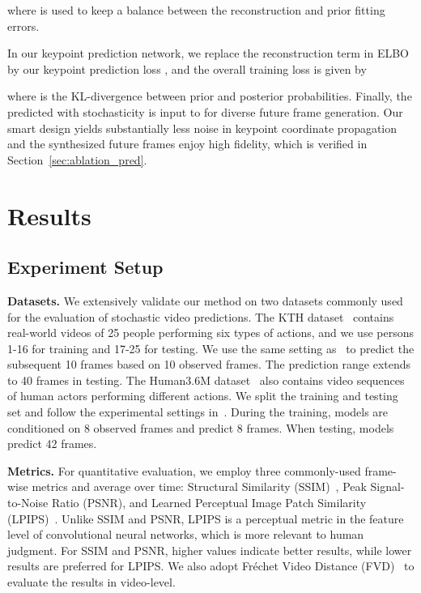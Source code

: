 \documentclass[letterpaper, 10 pt, conference]{ieeeconf}
\begin{document}
where  is used to keep a balance between the reconstruction and prior fitting errors. 

In our keypoint prediction network, we replace the reconstruction term in ELBO by our keypoint prediction loss , and the overall training loss is given by

where  is the KL-divergence between prior and posterior probabilities. 
Finally, the predicted  with stochasticity is input to  for diverse future frame generation.
Our smart design yields substantially less noise in keypoint coordinate propagation and the synthesized future frames enjoy high fidelity, which is verified in Section~\ref{sec:ablation_pred}.







\section{Results}

\subsection{Experiment Setup}
\noindent\textbf{Datasets.}
We extensively validate our method on two datasets commonly used for the evaluation of stochastic video predictions. 
The KTH dataset~\cite{schuldt2004recognizing} contains real-world videos of 25 people performing six types of actions, and we use persons 1-16 for training and 17-25 for testing.
We use the same setting as~\cite{denton2018stochastic} to predict the subsequent 10 frames based on 10 observed frames. 
The prediction range extends to 40 frames in testing. 
The Human3.6M dataset~\cite{ionescu2013human3} also contains video sequences of human actors performing different actions.
We split the training and testing set and follow the experimental settings in~\cite{minderer2019unsupervised}.
During the training, models are conditioned on 8 observed frames and predict 8 frames. 
When testing, models predict 42 frames.




\noindent\textbf{Metrics.} 
For quantitative evaluation, we employ three commonly-used frame-wise metrics and average over time:
Structural Similarity (SSIM)~\cite{wang2004image}, Peak Signal-to-Noise Ratio (PSNR), and Learned Perceptual Image Patch Similarity (LPIPS)~\cite{zhang2018unreasonable}. 
Unlike SSIM and PSNR, LPIPS is a perceptual metric in the feature level of convolutional neural networks, which is more relevant to human judgment.
For SSIM and PSNR, higher values indicate better results, while lower results are preferred for LPIPS.
We also adopt Fr\'echet Video Distance (FVD)~\cite{unterthiner2018towards} to evaluate the results in video-level. 
\end{document}
